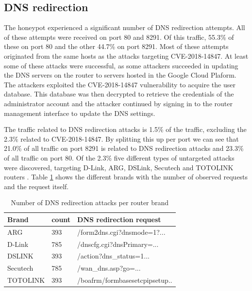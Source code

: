 \subsection{DNS redirection}
The honeypot experienced a significant number of DNS redirection attempts. All of these attempts were received on port 80 and 8291. Of this traffic, 55.3\% of these on port 80 and the other 44.7\% on port 8291. Most of these attempts originated from the same hosts as the attacks targeting CVE-2018-14847. At least some of these attacks were successful, as some attackers succeeded in updating the DNS servers on the router to servers hosted in the Google Cloud Plaform. The attackers exploited the CVE-2018-14847 vulnerability to acquire the user database. This database was then decrypted to retrieve the credentials of the administrator account and the attacker continued by signing in to the router management interface to update the DNS settings.

The traffic related to DNS redirection attacks is 1.5\% of the traffic, excluding the 2.3\% related to CVE-2018-14847. By splitting this up per port we can see that 21.0\% of all traffic on port 8291 is related to DNS redirection attacks and 23.3\% of all traffic on port 80. Of the 2.3\% five different types of untargeted attacks were discovered, targeting D-Link, ARG, DSLink, Secutech and TOTOLINK routers \cite{DLINK:DNSHIJACK:2019}. Table \ref{table:dns_redirection_requests} shows the different brands with the number of observed requests and the request itself.

\begin{table}[h]
\centering
\begin{tabular}{ |l|l|l| } 
\hline
Brand & count & DNS redirection request \\ \hline
ARG & 393 & /form2dns.cgi?dnsmode=1?...\\ \hline
D-Link & 785 & /dnscfg.cgi?dnsPrimary=...\\ \hline
DSLINK & 393 & /action?dns\_status=1...\\ \hline
Secutech & 785 & /wan\_dns.asp?go=...\\ \hline
TOTOLINK & 393 & /boafrm/formbasesetcpipsetup.. \\ \hline
\end{tabular}
\caption{Number of DNS redirection attacks per router brand}
\label{table:dns_redirection_requests}
\end{table}

